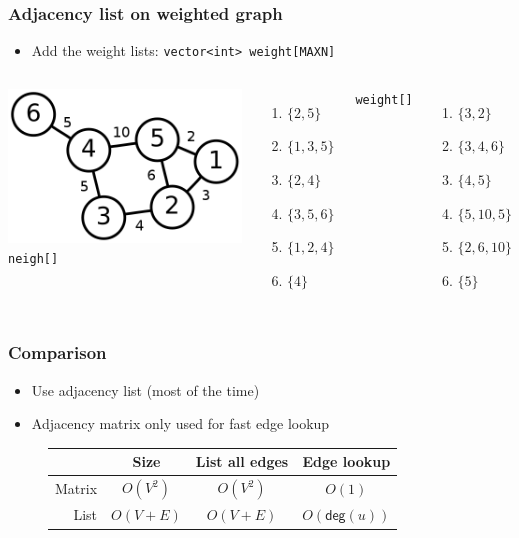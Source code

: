 \documentclass[12pt]{beamer}
\begin{document}
\begin{frame}
\frametitle{Adjacency list on weighted graph}
\begin{itemize}
\item Add the weight lists: \texttt{vector<int> weight[MAXN]}
\end{itemize}
\begin{columns}
\flushright
\includegraphics[width=0.8\linewidth]{img/6n-weighted}
\texttt{neigh[]}
\begin{enumerate}
\item $\{2,5\}$
\item $\{1,3,5\}$
\item $\{2,4\}$
\item $\{3,5,6\}$
\item $\{1,2,4\}$
\item $\{4\}$
\end{enumerate}
\texttt{weight[]}
\begin{enumerate}
\item $\{3,2\}$
\item $\{3,4,6\}$
\item $\{4,5\}$
\item $\{5,10,5\}$
\item $\{2,6,10\}$
\item $\{5\}$
\end{enumerate}
\end{columns}
\end{frame}

\begin{frame}
\frametitle{Comparison}
\begin{itemize}
\item Use adjacency list (most of the time)
\item Adjacency matrix only used for fast edge lookup
\end{itemize}
\begin{figure}
\centering
\begin{tabular}{rccc}
& Size & List all edges & Edge lookup \\
\midrule
\multicolumn{1}{r|}{Matrix} & $O(V^2)$ & $O(V^2)$ & $O(1)$ \\
\multicolumn{1}{r|}{List} & $O(V+E)$ & $O(V+E)$ & $O(\mathsf{deg}(u))$
\end{tabular}
\end{figure}
\end{frame}
\end{document}
